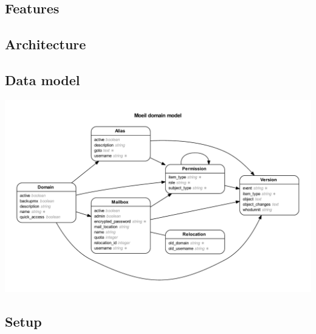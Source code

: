 \documentclass[12pt,a4paper]{scrartcl}
\begin{document}
		\label{sec:moeil:features}
		\subsection*{Features}

		\subsection*{Architecture}

		\subsection*{Data model}
			\includegraphics[width=\textwidth]{images/erd.pdf}

		\subsection*{Setup}

	

	\printbibliography
\end{document}
